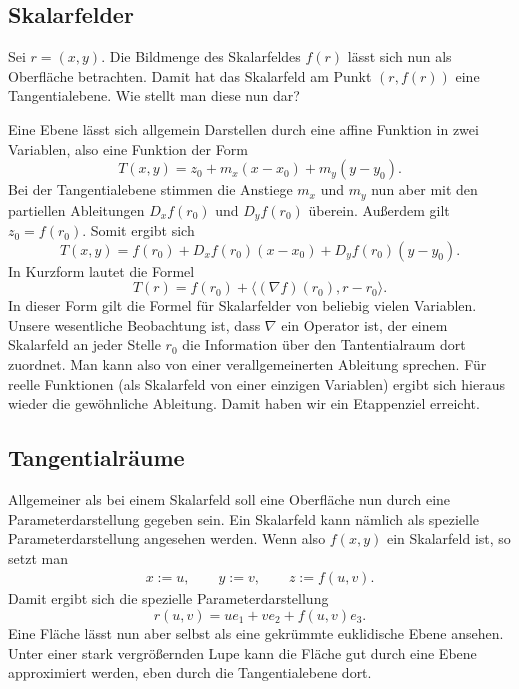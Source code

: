 \documentclass[a4paper,12pt,fleqn,dvipdfmx]{article}
\begin{document}
\subsection{Skalarfelder}
Sei $r=(x,y)$. Die Bildmenge des Skalarfeldes $f(r)$ lässt sich
nun als Oberfläche betrachten. Damit hat das Skalarfeld am
Punkt $(r,f(r))$ eine Tangentialebene. Wie stellt man diese
nun dar? 

Eine Ebene lässt sich allgemein Darstellen durch
eine affine Funktion in zwei Variablen, also eine Funktion der
Form
\[T(x,y) = z_0 + m_x (x-x_0)+ m_y (y-y_0).\]
Bei der Tangentialebene stimmen die Anstiege $m_x$ und $m_y$
nun aber mit den partiellen Ableitungen $D_x f(r_0)$ und $D_y f(r_0)$
überein. Außerdem gilt $z_0=f(r_0)$. Somit ergibt sich
\begin{equation}
T(x,y) = f(r_0)+D_xf(r_0)(x-x_0)+D_y f(r_0)(y-y_0).
\end{equation}
In Kurzform lautet die Formel
\begin{equation}
T(r) = f(r_0)+\langle (\nabla f)(r_0),r-r_0\rangle.
\end{equation}
In dieser Form gilt die Formel für Skalarfelder von beliebig
vielen Variablen. Unsere wesentliche Beobachtung ist, dass
$\nabla$ ein Operator ist, der einem Skalarfeld an jeder Stelle
$r_0$ die Information über den Tantentialraum dort zuordnet.
Man kann also von einer verallgemeinerten Ableitung sprechen. Für
reelle Funktionen (als Skalarfeld von einer einzigen Variablen)
ergibt sich hieraus wieder die gewöhnliche Ableitung.
Damit haben wir ein Etappenziel erreicht.

\subsection{Tangentialräume}

Allgemeiner als bei einem Skalarfeld soll eine Oberfläche nun
durch eine Parameterdarstellung gegeben sein. Ein Skalarfeld kann
nämlich als spezielle Parameterdarstellung angesehen werden.
Wenn also $f(x,y)$ ein Skalarfeld ist, so setzt man
\begin{gather*}
x:=u,\qquad y:=v,\qquad z:=f(u,v).
\end{gather*}
Damit ergibt sich die spezielle Parameterdarstellung
\begin{equation}
r(u,v) = ue_1+ve_2+f(u,v)e_3.
\end{equation}
Eine Fläche lässt nun aber selbst als eine gekrümmte euklidische
Ebene ansehen. Unter einer stark vergrößernden Lupe kann die
Fläche gut durch eine Ebene approximiert werden, eben durch die
Tangentialebene dort.
\end{document}
